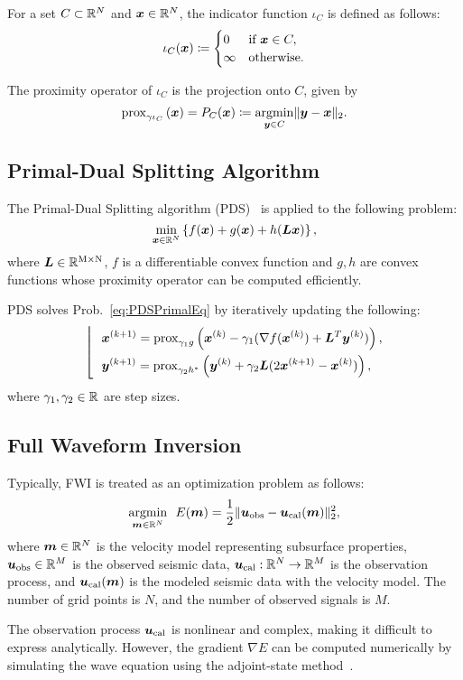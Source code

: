 For a set $C \subset \mathbb{R}^N$ and $\bm{x} \in \mathbb{R}^N$, the indicator function $\iota_C$ is defined as follows:
\begin{equation} \label{eq:IndicatorFunctionDefinitionEq} \iota_{C}(\bm{x}) \coloneq \begin{cases} 0 & \text{if } \bm{x} \in C, \\ \infty & \text{otherwise}. \end{cases} \end{equation}

The proximity operator of $\iota_C$ is the projection onto $C$, given by
\begin{equation} \label{eq:ProximityOperatorDefinitionWithIndicatorFunctionEq}
\mathrm{prox}_{ \gamma \iota_{C} }\left(\bm{x}\right) = P_C(\bm{x}) \coloneq \underset{\bm{y} \in C}{\mathrm{argmin}} \lVert \bm{y} - \bm{x} \rVert _2.
\end{equation}



\subsection{Primal-Dual Splitting Algorithm} \label{subsec:primal-dual-splitting-algorithm}

The Primal-Dual Splitting algorithm (PDS)~\cite{PDS0,PDS1,PDS2,PDS3} is applied to the following problem:
\begin{equation} \label{eq:PDSPrimalEq} \underset{ \bm{x} \in \mathbb{R}^N }{\mathrm{min}} \left\{ f(\bm{x}) + g(\bm{x}) + h(\bm{L} \bm{x}) \right\}, \end{equation}
where $\bm{L} \in \mathbb{R}^{\mathrm{M} \times \mathrm{N}}$, $f$ is a differentiable convex function and $g,h$ are convex functions whose proximity operator can be computed efficiently.

PDS solves Prob.~\eqref{eq:PDSPrimalEq} by iteratively updating the following:
\begin{equation} \label{eq:PDSSubStep} \left \lfloor \ \ \begin{aligned} & \bm{x}^{(k+1)} = \mathrm{prox}_{\gamma_1 g}\left(\bm{x}^{(k)} - \gamma_1( \nabla f(\bm{x}^{(k)}) + \bm{L}^T \bm{y}^{(k)} )\right), \\ & \bm{y}^{(k+1)} = \mathrm{prox}_{\gamma_2 h^*}\left(\bm{y}^{(k)} + \gamma_2 \bm{L} (2\bm{x}^{(k+1)} - \bm{x}^{(k)}) \right), \\ \end{aligned} \right. \end{equation}
where $\gamma_1, \gamma_2 \in \mathbb{R}$ are step sizes.





\subsection{Full Waveform Inversion} \label{subsec:full-waveform-inversion}

Typically, FWI is treated as an optimization problem as follows\cite{FWI0}:
\begin{equation} \label{eq:FWIObjective} \underset{\bm{m} \in \mathbb{R}^N}{\mathrm{argmin}} \ \ E(\bm{m}) = \frac {1} {2} \lVert  \bm{u}_{\mathrm{obs}} - \bm{u}_{\mathrm{cal}}(\bm{m})  \rVert _2^2, \end{equation}
where $\bm{m} \in \mathbb{R}^{N}$ is the velocity model representing subsurface properties, $\bm{u}_{\mathrm{obs}} \in \mathbb{R}^{M}$ is the observed seismic data, $\bm{u}_{\mathrm{cal}} : \mathbb{R}^{N} \rightarrow \mathbb{R}^{M}$ is the observation process, and $\bm{u}_{\mathrm{cal}}(\bm{m})$ is the modeled seismic data with the velocity model.
The number of grid points is $N$, and the number of observed signals is $M$.

The observation process $\bm{u}_{\mathrm{cal}}$ is nonlinear and complex, making it difficult to express analytically.
However, the gradient $\nabla E$ can be computed numerically by simulating the wave equation using the adjoint-state method~\cite{FWI-gradient}.
